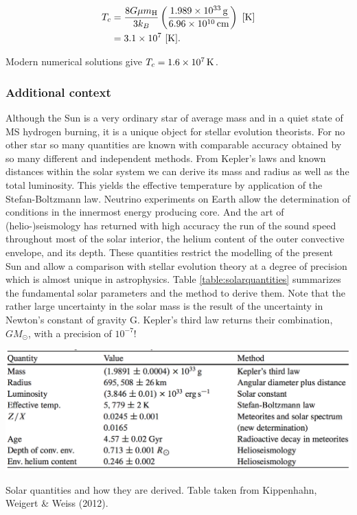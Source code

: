 \documentclass[a4paper,10pt]{article}
\begin{document}
\begin{align*}
    T_c &= \frac{8G\mu m_{\rm H}}{3k_B}\left(\frac{1.989\times10^{33}\,{\rm g}}{6.96\times10^{10}\,{\rm cm}}\right) ~ [{\rm K}] \\
    &= 3.1\times10^7 ~ [{\rm K}].
\end{align*}

{\noindent}Modern numerical solutions give $T_c=1.6\times10^7\,{\rm K}$.

\subsubsection{Additional context}

Although the Sun is a very ordinary star of average mass and in a quiet state of MS hydrogen burning, it is a unique object for stellar evolution theorists. For no other star so many quantities are known with comparable accuracy obtained by so many different and independent methods. From Kepler's laws and known distances within the solar system we can derive its mass and radius as well as the total luminosity. This yields the effective temperature by application of the Stefan-Boltzmann law. Neutrino experiments on Earth allow the determination of conditions in the innermost energy producing core. And the art of (helio-)seismology has returned with high accuracy the run of the sound speed throughout most of the solar interior, the helium content of the outer convective envelope, and its depth. These quantities restrict the modelling of the present Sun and allow a comparison with stellar evolution theory at a degree of precision which is almost unique in astrophysics. Table \ref{table:solarquantities} summarizes the fundamental solar parameters and the method to derive them. Note that the rather large uncertainty in the solar mass is the result of the uncertainty in Newton's constant of gravity G. Kepler's third law returns their combination, $GM_\odot$, with a precision of $10^{-7}$!

\begin{table}[t]
    \centering
    \includegraphics[width=14cm]{figures/SolarQuantities.png}
    \caption{\footnotesize{Solar quantities and how they are derived. Table taken from Kippenhahn, Weigert \& Weiss (2012).}}
    \label{table:solarquantities}
\end{table}
\end{document}
